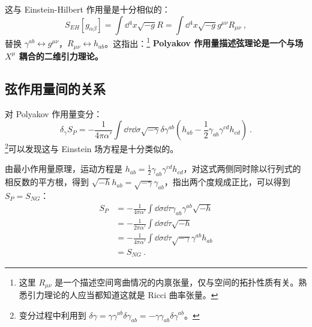 这与 Einstein-Hilbert 作用量是十分相似的：
\begin{equation}
S_{EH}[g_{\alpha \beta}] = \int \dd{}^4 x \sqrt{-g} R = \int \dd{}^4 x \sqrt{-g} g^{\mu\nu} R_{\mu\nu} ~,
\end{equation}
替换 $\gamma^{ab} \leftrightarrow g^{\mu\nu}$，$R_{\mu\nu} \leftrightarrow h_{ab}$。这指出：\footnote{这里 $R_{\mu\nu}$ 是一个描述空间弯曲情况的内禀张量，仅与空间的拓扑性质有关。熟悉引力理论的人应当都知道这就是 Ricci 曲率张量。}
	\textbf{Polyakov 作用量描述弦理论是一个与场 $X^\mu$ 耦合的二维引力理论。}

\subsection{弦作用量间的关系}
对 Polyakov 作用量变分：
\begin{equation}
	\delta_{\gamma} S_P = -\frac{1}{4\pi \alpha'} \int \dd \tau \dd \sigma \sqrt{-\gamma} \delta \gamma^{ab} \left(h_{ab} - \frac{1}{2} \gamma_{ab} \gamma^{cd} h_{cd}\right) ~.
\end{equation}
\footnote{变分过程中利用到 $\delta \gamma = \gamma \gamma^{ab} \delta \gamma_{ab} = -\gamma \gamma_{ab} \delta \gamma^{ab}$。}可以发现这与 Einstein 场方程是十分类似的。

由最小作用量原理，运动方程是 $h_{ab} = \frac{1}{2} \gamma_{ab} \gamma^{cd} h_{cd}$，对这式两侧同时除以行列式的相反数的平方根，得到 $\sqrt{-h} h_{ab} = \sqrt{-\gamma} \gamma_{ab}$，指出两个度规成正比，可以得到 $S_P = S_{NG}$：
\begin{equation}
	\begin{aligned}
		S_P &= -\frac{1}{4 \pi \alpha'} \int \dd \sigma \dd \tau \gamma_{ab} \gamma^{ab} \sqrt{-h} \\ 
		&= -\frac{1}{2\pi \alpha'} \int \dd \sigma \dd\tau \sqrt{-h} \\ 
		&= -\frac{1}{4\pi\alpha'} \int \dd \sigma \dd \tau \sqrt{-\gamma} \gamma^{ab} h_{ab} \\
		&= S_{NG} ~.
	\end{aligned}
\end{equation}

